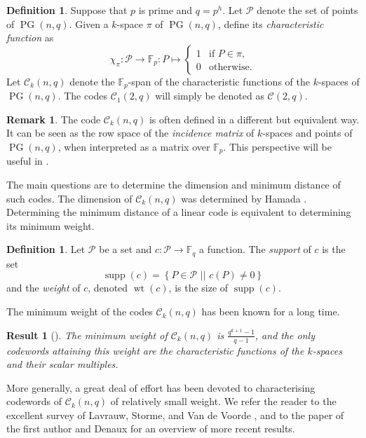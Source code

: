 \documentclass[12pt, a4paper]{article}
\newtheorem{res}[thm]{Result}
\theoremstyle{definition}
\newtheorem{rmk}[thm]{Remark}
\newtheorem{df}[thm]{Definition}
\newcommand{\FF}{\mathbb F}
\newcommand{\sett}[2]{ \left\{ #1 \, \, || \, \, #2 \right \} }
\newcommand{\mc}{\mathcal C}
\renewcommand{\mp}{\mathcal P}
\DeclareMathOperator{\supp}{supp}
\DeclareMathOperator{\wt}{wt}
\DeclareMathOperator{\PG}{PG}
\newcommand{\pg}{\PG}
\begin{document}
\begin{df}
 Suppose that $p$ is prime and $q = p^h$.
 Let $\mp$ denote the set of points of $\pg(n,q)$.
 Given a $k$-space $\pi$ of $\pg(n,q)$, define its \emph{characteristic function} as
 \[
  \chi_{\pi}: \mp \to \FF_p: P \mapsto \begin{cases}
   1 & \text{if } P \in \pi, \\
   0 & \text{otherwise}.
  \end{cases}
 \]
 Let $\mc_k(n,q)$ denote the $\FF_p$-span of the characteristic functions of the $k$-spaces of $\pg(n,q)$.
 The codes $\mc_1(2,q)$ will simply be denoted as $\mc(2,q)$.
\end{df}

\begin{rmk}
 The code $\mc_k(n,q)$ is often defined in a different but equivalent way.
 It can be seen as the row space of the \emph{incidence matrix} of $k$-spaces and points of $\pg(n,q)$, when interpreted as a matrix over $\FF_p$.
 This perspective will be useful in .
\end{rmk}

The main questions are to determine the dimension and minimum distance of such codes.
The dimension of $\mc_k(n,q)$ was determined by Hamada \cite[Theorem 1]{hamada1968}.
Determining the minimum distance of a linear code is equivalent to determining its minimum weight.

\begin{df}
 Let $\mp$ be a set and $c:\mp \to \FF_q$ a function.
 The \emph{support} of $c$ is the set
 \[
  \supp(c) = \sett{P \in \mp}{c(P) \neq 0}
 \]
 and the \emph{weight} of $c$, denoted $\wt(c)$, is the size of $\supp(c)$.
\end{df}

The minimum weight of the codes $\mc_k(n,q)$ has been known for a long time.

\begin{res}[{\cite[\S 5.2.1]{delsartegoethalsmacwilliams}}]
 \label{Res:MinWt}
 The minimum weight of $\mc_k(n,q)$ is $\frac{q^{k+1}-1}{q-1}$, and the only codewords attaining this weight are the characteristic functions of the $k$-spaces and their scalar multiples.
\end{res}

More generally, a great deal of effort has been devoted to characterising codewords of $\mc_k(n,q)$ of relatively small weight.
We refer the reader to the excellent survey of
Lavrauw, Storme, and Van de Voorde \cite{Lavrauw:Storme:VandeVoorde:10}, and to the paper of the first author and Denaux \cite{Adriaensen:Denaux:24} for an overview of more recent results.
\end{document}
